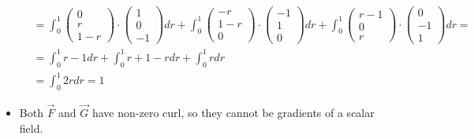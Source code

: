 \documentclass[11pt]{article}
\begin{document}
\begin{solution}
\begin{itemize}
\begin{align*}
	&= \int_0^1 \begin{pmatrix}0\\r\\1-r\end{pmatrix}\cdot\begin{pmatrix}1\\0\\-1\end{pmatrix}dr + \int_0^1 \begin{pmatrix}-r\\1-r\\0\end{pmatrix}\cdot\begin{pmatrix}-1\\1\\0\end{pmatrix}dr + \int_0^1 \begin{pmatrix}r-1\\0\\r\end{pmatrix}\cdot\begin{pmatrix}0\\-1\\1\end{pmatrix}dr =\\
	&= \int_0^1 r-1dr + \int_0^1 r + 1- r dr + \int_0^1 rdr\\
	&= \int_0^1 2rdr = 1
	\end{align*}
    \item 
     Both $\vec F$ and $\vec G$ have non-zero curl, so they cannot be gradients of a scalar field. 
    \end{itemize}
\end{solution}
\end{document}
